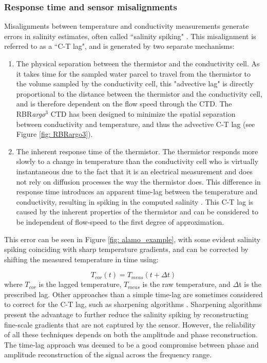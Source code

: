 \documentclass{ametsocV6.1}
\begin{document}
\subsubsection{Response time and sensor misalignments}
Misalignments between temperature and conductivity measurements generate errors in salinity estimates, often called ``salinity spiking" \citep{Horne_1980,Ullman_2014,Dever_2020}. This misalignment is referred to as a ``C-T lag", and is generated by two separate mechanisms:
\begin{enumerate}
	\item The physical separation between the thermistor and the conductivity cell. As it takes time for the sampled water parcel to travel from the thermistor to the volume sampled by the conductivity cell, this "advective lag" is directly proportional to the distance between the thermistor and the conductivity cell, and is therefore dependent on the flow speed through the CTD. The RBR\textit{argo}$^3$ CTD has been designed to minimize the spatial separation between conductivity and temperature, and thus the advective C-T lag (see Figure \ref{fig: RBRargo3}).
	\item The inherent response time of the thermistor. The thermistor responds more slowly to a change in temperature than the conductivity cell who is virtually instantaneous due to the fact that it is an electrical measurement and does not rely on diffusion processes the way the thermistor does. This difference in response time introduces an apparent time-lag between the temperature and conductivity, resulting in spiking in the computed salinity \citep{Horne_1980}. This C-T lag is caused by the inherent properties of the thermistor and can be considered to be independent of flow-speed to the first degree of approximation.
\end{enumerate}

This error can be seen in Figure \ref{fig: alamo_example}, with some evident salinity spiking coinciding with sharp temperature gradients, and can be corrected by shifting the measured temperature in time using:

\begin{equation}
T_{cor}(t) = T_{meas}(t + \Delta t)
\label{eq: CTlag}
\end{equation}
where $T_{cor}$ is the lagged temperature, $T_{meas}$ is the raw temperature, and $\Delta$t is the prescribed lag. Other approaches than a simple time-lag are sometimes considered to correct for the C-T lag, such as sharpening algorithms \citep{Fozdar_1985, Bittig_2014,Johnson_2007}. Sharpening algorithms present the advantage to further reduce the salinity spiking by reconstructing fine-scale gradients that are not captured by the sensor.  However, the reliability of all these techniques depends on both the amplitude and phase reconstruction.  The time-lag approach was deemed to be a good compromise between phase and amplitude reconstruction of the signal across the frequency range. 
\end{document}
